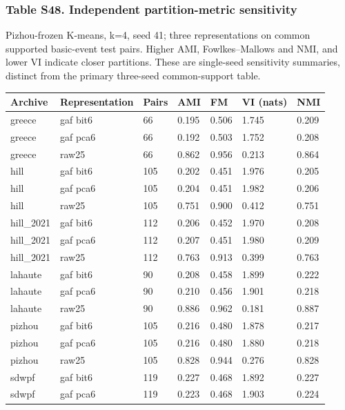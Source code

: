 \documentclass[a4paper,11pt]{article}
\newcounter{none}
\begin{document}
\subsubsection{Table S48. Independent partition-metric sensitivity}\label{table-s48.-independent-partition-metric-sensitivity}

Pizhou-frozen K-means, k=4, seed 41; three representations on common supported basic-event test pairs. Higher AMI, Fowlkes--Mallows and NMI, and lower VI indicate closer partitions. These are single-seed sensitivity summaries, distinct from the primary three-seed common-support table.

{\def\LTcaptype{none} %
\begin{longtable}[]{@{}lllllll@{}}
\toprule\noalign{}
Archive & Representation & Pairs & AMI & FM & VI (nats) & NMI \\
\midrule\noalign{}
\endhead
\bottomrule\noalign{}
\endlastfoot
greece & gaf bit6 & 66 & 0.195 & 0.506 & 1.745 & 0.209 \\
greece & gaf pca6 & 66 & 0.192 & 0.503 & 1.752 & 0.208 \\
greece & raw25 & 66 & 0.862 & 0.956 & 0.213 & 0.864 \\
hill & gaf bit6 & 105 & 0.202 & 0.451 & 1.976 & 0.205 \\
hill & gaf pca6 & 105 & 0.204 & 0.451 & 1.982 & 0.206 \\
hill & raw25 & 105 & 0.751 & 0.900 & 0.412 & 0.751 \\
hill\_2021 & gaf bit6 & 112 & 0.206 & 0.452 & 1.970 & 0.208 \\
hill\_2021 & gaf pca6 & 112 & 0.207 & 0.451 & 1.980 & 0.209 \\
hill\_2021 & raw25 & 112 & 0.763 & 0.913 & 0.399 & 0.763 \\
lahaute & gaf bit6 & 90 & 0.208 & 0.458 & 1.899 & 0.222 \\
lahaute & gaf pca6 & 90 & 0.210 & 0.456 & 1.901 & 0.218 \\
lahaute & raw25 & 90 & 0.886 & 0.962 & 0.181 & 0.887 \\
pizhou & gaf bit6 & 105 & 0.216 & 0.480 & 1.878 & 0.217 \\
pizhou & gaf pca6 & 105 & 0.216 & 0.480 & 1.880 & 0.218 \\
pizhou & raw25 & 105 & 0.828 & 0.944 & 0.276 & 0.828 \\
sdwpf & gaf bit6 & 119 & 0.227 & 0.468 & 1.892 & 0.227 \\
sdwpf & gaf pca6 & 119 & 0.223 & 0.468 & 1.903 & 0.224 \\

\end{longtable}}
\end{document}
